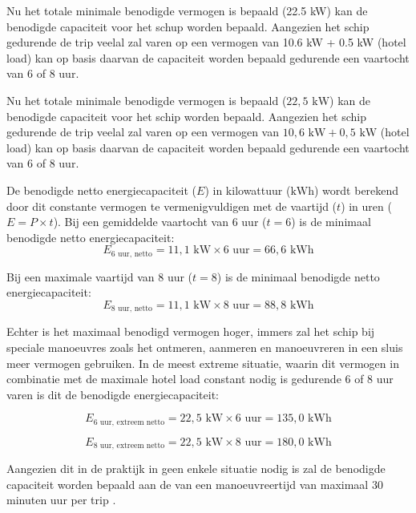 \noindent Nu het totale minimale benodigde vermogen is bepaald (22.5 kW) kan de benodigde capaciteit voor het schup worden bepaald. Aangezien het schip gedurende de trip veelal zal varen op een vermogen van 10.6 kW + 0.5 kW (hotel load) kan op basis daarvan de capaciteit worden bepaald gedurende een vaartocht van 6 of 8 uur.

\noindent Nu het totale minimale benodigde vermogen is bepaald ($22{,}5 \text{ kW}$) kan de benodigde capaciteit voor het schip worden bepaald. Aangezien het schip gedurende de trip veelal zal varen op een vermogen van $10{,}6 \text{ kW} + 0{,}5 \text{ kW}$ (hotel load) kan op basis daarvan de capaciteit worden bepaald gedurende een vaartocht van 6 of 8 uur.


\noindent De benodigde netto energiecapaciteit ($E$) in kilowattuur ($\text{kWh}$) wordt berekend door dit constante vermogen te vermenigvuldigen met de vaartijd ($t$) in uren ($E = P \times t$). Bij een gemiddelde vaartocht van 6 uur ($t = 6$) is de minimaal benodigde netto energiecapaciteit:
\begin{equation}
E_{\text{6 uur, netto}} = 11{,}1 \text{ kW} \times 6 \text{ uur} = 66{,}6 \text{ kWh}
\end{equation}

\noindent Bij een maximale vaartijd van  8 uur  ($t = 8$) is de minimaal benodigde netto energiecapaciteit:
\begin{equation}
E_{\text{8 uur, netto}} = 11{,}1 \text{ kW} \times 8 \text{ uur} = 88{,}8 \text{ kWh}
\end{equation}

\noindent Echter is het maximaal benodigd vermogen hoger, immers zal het schip bij speciale manoeuvres zoals het ontmeren, aanmeren en manoeuvreren in een sluis meer vermogen gebruiken. In de meest extreme situatie, waarin dit vermogen in combinatie met de maximale hotel load constant nodig is gedurende 6 of 8 uur varen is dit de benodigde energiecapaciteit:

\begin{equation}
E_{\text{6 uur, extreem netto}} = 22{,}5 \text{ kW} \times 6 \text{ uur} = 135{,}0 \text{ kWh}
\end{equation}

\begin{equation}
E_{\text{8 uur, extreem netto}} = 22{,}5 \text{ kW} \times 8 \text{ uur} = 180{,}0 \text{ kWh}
\end{equation}

\noindent Aangezien dit in de praktijk in geen enkele situatie nodig is zal de benodigde capaciteit worden bepaald aan de van een manoeuvreertijd van maximaal 30 minuten uur per trip \cite{vanbaalen2026interview}.

